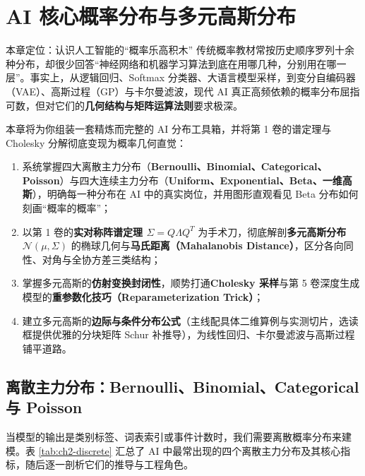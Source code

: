 \chapter[AI 核心概率分布与多元高斯]{AI 核心概率分布与多元高斯分布}
\label{ch:ch2}


\begin{chapIntro}{本章定位：认识人工智能的“概率乐高积木”}
传统概率教材常按历史顺序罗列十余种分布，却很少回答“神经网络和机器学习算法到底在用哪几种，分别用在哪一层”。事实上，从逻辑回归、Softmax 分类器、大语言模型采样，到变分自编码器（VAE）、高斯过程（GP）与卡尔曼滤波，现代 AI 真正高频依赖的概率分布屈指可数，但对它们的\textbf{几何结构与矩阵运算法则}要求极深。

本章将为你组装一套精炼而完整的 AI 分布工具箱，并将第 1 卷的谱定理与 Cholesky 分解彻底变现为概率几何直觉：
\begin{enumerate}
  \item 系统掌握四大离散主力分布（\textbf{Bernoulli、Binomial、Categorical、Poisson}）与四大连续主力分布（\textbf{Uniform、Exponential、Beta、一维高斯}），明确每一种分布在 AI 中的真实岗位，并用图形直观看见 Beta 分布如何刻画“概率的概率”；
  \item 以第 1 卷的\textbf{实对称阵谱定理 $\Sigma = Q\Lambda Q^T$} 为手术刀，彻底解剖\textbf{多元高斯分布 $\mathcal{N}(\mu, \Sigma)$} 的椭球几何与\textbf{马氏距离（Mahalanobis Distance）}，区分各向同性、对角与全协方差三类结构；
  \item 掌握多元高斯的\textbf{仿射变换封闭性}，顺势打通\textbf{Cholesky 采样}与第 5 卷深度生成模型的\textbf{重参数化技巧（Reparameterization Trick）}；
  \item 建立多元高斯的\textbf{边际与条件分布公式}（主线配具体二维算例与实测切片，选读框提供优雅的分块矩阵 Schur 补推导），为线性回归、卡尔曼滤波与高斯过程铺平道路。
\end{enumerate}
\end{chapIntro}

\section{离散主力分布：Bernoulli、Binomial、Categorical 与 Poisson}
\label{sec:ch2-discrete}

当模型的输出是类别标签、词表索引或事件计数时，我们需要离散概率分布来建模。表 \ref{tab:ch2-discrete} 汇总了 AI 中最常出现的四个离散主力分布及其核心指标，随后逐一剖析它们的推导与工程角色。

